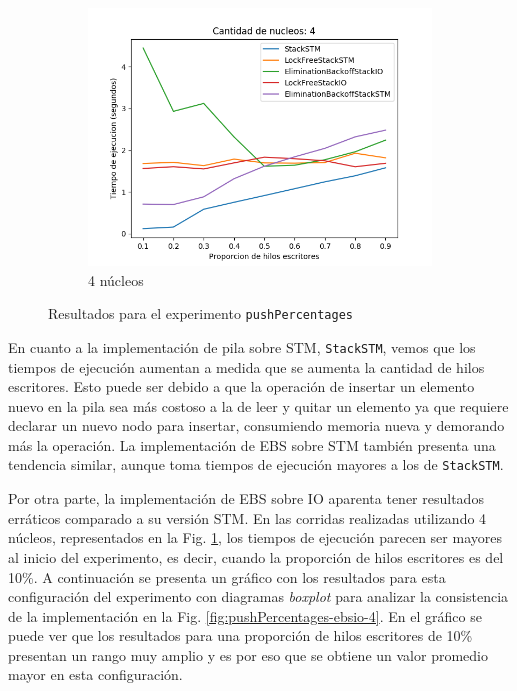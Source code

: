 \begin{figure}[H]
\begin{subfigure}[b]{0.5\textwidth}
        \includegraphics[width=\textwidth]{images/pushPercentages/plots/4.png}
        \caption{4 núcleos}
        \label{subfig:pushPercentages-4core}
    \end{subfigure}
    \caption{Resultados para el experimento \texttt{pushPercentages}}
    \label{fig:pushPercentages-all}
\end{figure}

En cuanto a la implementación de pila sobre STM, \texttt{StackSTM}, vemos que los tiempos de ejecución aumentan a medida que se aumenta la cantidad de hilos escritores.
Esto puede ser debido a que la operación de insertar un elemento nuevo en la pila sea más costoso a la de leer y quitar un elemento ya que requiere declarar un nuevo nodo para insertar, consumiendo memoria nueva y demorando más la operación.
La implementación de EBS sobre STM también presenta una tendencia similar, aunque toma tiempos de ejecución mayores a los de \texttt{StackSTM}.

Por otra parte, la implementación de EBS sobre IO aparenta tener resultados erráticos comparado a su versión STM.
En las corridas realizadas utilizando 4 núcleos, representados en la Fig. \ref{subfig:pushPercentages-4core}, los tiempos de ejecución parecen ser mayores al inicio del experimento, es decir, cuando la proporción de hilos escritores es del 10\%.
A continuación se presenta un gráfico con los resultados para esta configuración del experimento con diagramas \emph{boxplot} para analizar la consistencia de la implementación en la Fig. \ref{fig:pushPercentages-ebsio-4}.
En el gráfico se puede ver que los resultados para una proporción de hilos escritores de 10\% presentan un rango muy amplio y es por eso que se obtiene un valor promedio mayor en esta configuración.


